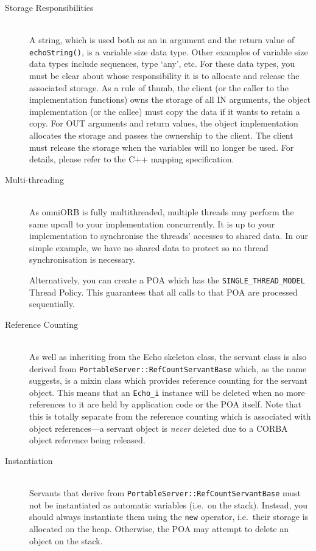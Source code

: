 \documentclass[11pt,twoside,a4paper]{book}
\newcommand{\type}[1]{\texttt{#1}}
\newcommand{\code}[1]{\texttt{#1}}
\newcommand{\op}[1]{\texttt{#1()}}
\begin{document}
\begin{description}

\item[Storage Responsibilities]\mbox{}\\
%
A string, which is used both as an in argument and the return value of
\op{echoString}, is a variable size data type. Other examples of
variable size data types include sequences, type `any', etc. For these
data types, you must be clear about whose responsibility it is to
allocate and release the associated storage. As a rule of thumb, the
client (or the caller to the implementation functions) owns the
storage of all IN arguments, the object implementation (or the callee)
must copy the data if it wants to retain a copy. For OUT arguments and
return values, the object implementation allocates the storage and
passes the ownership to the client. The client must release the
storage when the variables will no longer be used.  For details,
please refer to the C++ mapping specification.

\item[Multi-threading]\mbox{}\\
%
As omniORB is fully multithreaded, multiple threads may perform the
same upcall to your implementation concurrently. It is up to your
implementation to synchronise the threads' accesses to shared data.
In our simple example, we have no shared data to protect so no thread
synchronisation is necessary.

Alternatively, you can create a POA which has the
\code{SINGLE\_THREAD\_MODEL} Thread Policy. This guarantees that all
calls to that POA are processed sequentially.

\item[Reference Counting]\mbox{}\\
%
As well as inheriting from the Echo skeleton class, the servant class
is also derived from \type{PortableServer::RefCountServantBase} which,
as the name suggests, is a mixin class which provides reference
counting for the servant object. This means that an \type{Echo\_i}
instance will be deleted when no more references to it are held by
application code or the POA itself. Note that this is totally separate
from the reference counting which is associated with object
references---a servant object is \emph{never} deleted due to a CORBA
object reference being released.

\item[Instantiation]\mbox{}\\
%
Servants that derive from \type{PortableServer::RefCountServantBase}
must not be instantiated as automatic variables (i.e.\ on the stack).
Instead, you should always instantiate them using the \code{new}
operator, i.e.\ their storage is allocated on the heap. Otherwise, the
POA may attempt to delete an object on the stack.

\end{description}
\end{document}
